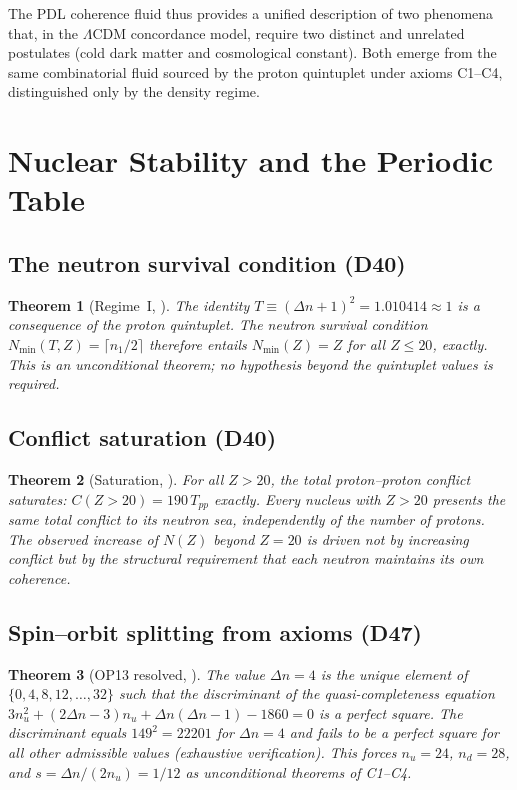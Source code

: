 \documentclass[11pt,a4paper]{article}
\theoremstyle{plain}
\newtheorem{theorem}{Theorem}[section]
\theoremstyle{definition}
\theoremstyle{remark}
\newcommand{\Tpp}{T_{pp}}
\begin{document}
The PDL coherence fluid thus provides a unified description of two phenomena that, in the $\Lambda$CDM concordance model, require two distinct and unrelated postulates (cold dark matter and cosmological constant). Both emerge from the same combinatorial fluid sourced by the proton quintuplet under axioms C1--C4, distinguished only by the density regime.


\section{Nuclear Stability and the Periodic Table}
\label{sec:nuclear}

\subsection{The neutron survival condition (D40)}
\label{subsec:neutronsurvival}
\begin{theorem}[Regime~I, \cite{D40}]
\label{thm:NminI}
The identity $T\equiv(\Delta n+1)^2=1.010414\approx 1$ is a consequence of the proton quintuplet. The neutron survival condition $N_{\min}(T,Z)=\lceil n_1/2\rceil$ therefore entails $N_{\min}(Z)=Z$ for all $Z\leq 20$, exactly. This is an unconditional theorem; no hypothesis beyond the quintuplet values is required.
\end{theorem}

\subsection{Conflict saturation (D40)}
\label{subsec:conflictsat}
\begin{theorem}[Saturation, \cite{D40}]
\label{thm:saturation}
For all $Z>20$, the total proton--proton conflict saturates: $C(Z>20)=190\,\Tpp$ exactly. Every nucleus with $Z>20$ presents the same total conflict to its neutron sea, independently of the number of protons. The observed increase of $N(Z)$ beyond $Z=20$ is driven not by increasing conflict but by the structural requirement that each neutron maintains its own coherence.
\end{theorem}

\subsection{Spin--orbit splitting from axioms (D47)}
\label{subsec:spinorbit}
\begin{theorem}[OP13 resolved, \cite{D47}]
\label{thm:spinorbit}
The value $\Delta n = 4$ is the unique element of \\ $\{0, 4, 8, 12, \ldots, 32\}$ such that the discriminant of the quasi-completeness equation $3n_u^2 + (2\Delta n - 3)n_u + \Delta n(\Delta n-1) - 1860 = 0$ is a perfect square. The discriminant equals $149^2 = 22201$ for $\Delta n = 4$ and fails to be a perfect square for all other admissible values (exhaustive verification). This forces $n_u = 24$, $n_d = 28$, and $s = \Delta n/(2n_u) = 1/12$ as unconditional theorems of C1--C4.
\end{theorem}
\end{document}
